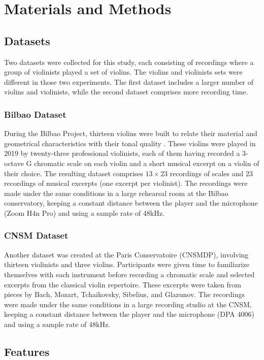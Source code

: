 \documentclass[11pt]{article}
\begin{document}
\section{Materials and Methods}\label{sec:methodology}

\subsection{Datasets}
Two datasets were collected for this study, each consisting of recordings where a group of violinists played a set of violins. The violins and violinists sets were different in those two experiments. The first dataset includes a larger number of violins and violinists, while the second dataset comprises more recording time.

\subsubsection{Bilbao Dataset}
During the Bilbao Project, thirteen violins were built to relate their material and geometrical characteristics with their tonal quality \cite{fritz2019a}. These violins were played in 2019 by twenty-three professional violinists, each of them having recorded a 3-octave G chromatic scale on each violin and a short musical excerpt on a violin of their choice. The resulting dataset comprises $13 \times 23$ recordings of scales and $23$ recordings of musical excerpts (one excerpt per violinist). The recordings were made under the same conditions in a large rehearsal room at the Bilbao conservatory, keeping a constant distance between the player and the microphone (Zoom H4n Pro) and using a sample rate of 48kHz.

\subsubsection{CNSM Dataset}
Another dataset was created at the Paris Conservatoire (CNSMDP), involving thirteen violinists and three violins. Participants were given time to familiarize themselves with each instrument before recording a chromatic scale and selected excerpts from the classical violin repertoire. These excerpts were taken from pieces by Bach, Mozart, Tchaikovsky, Sibelius, and Glazunov. The recordings were made under the same conditions in a large recording studio at the CNSM, keeping a constant distance between the player and the microphone (DPA 4006) and using a sample rate of 48kHz.

\subsection{Features}
\end{document}
